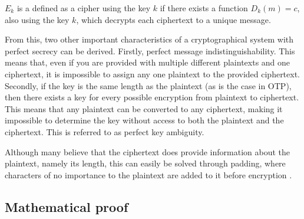 \documentclass[12pt]{report}
\theoremstyle{definition}
\theoremstyle{remark}
\begin{document}
$E_k$ is a defined as a cipher using the key $k$ if there exists a function $D_k(m)=c$, also using the key $k$, which decrypts each ciphertext to a unique message.

From this, two other important characteristics of a cryptographical system with perfect secrecy can be derived. Firstly, perfect message indistinguishability. This means that, even if you are provided with multiple different plaintexts and one ciphertext, it is impossible to assign any one plaintext to the provided ciphertext. Secondly, if the key is the same length as the plaintext (as is the case in OTP), then there exists a key for every possible encryption from plaintext to ciphertext. This means that any plaintext can be converted to any ciphertext, making it impossible to determine the key without access to both the plaintext and the ciphertext. This is referred to as perfect key ambiguity.		%

Although many believe that the ciphertext does provide information about the plaintext, namely its length, this can easily be solved through padding, where characters of no importance to the plaintext are added to it before encryption \cite{HutSix}.

\subsection{Mathematical proof}




\end{document}
